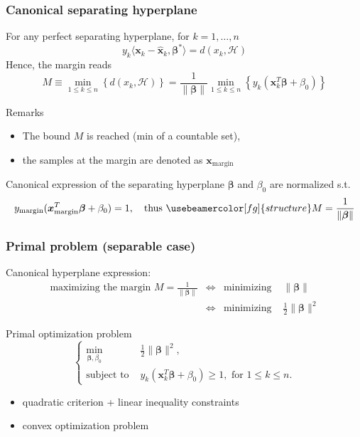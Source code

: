 \documentclass[compress, smaller, serif, 9pt]{beamer}
\newcommand{\structuretext}[1]{{\usebeamercolor[fg]{structure} #1}}
\newcommand{\doigt}{\structuretext{\noindent \Pisymbol{pzd}{43}}}
\newcommand{\bx}{{\boldsymbol{x}}}
\newcommand{\bbeta}{{\boldsymbol{\beta}}}
\begin{document}
  
    \begin{frame}
   \frametitle{Canonical separating hyperplane}

   For any perfect separating hyperplane, for  $k=1,\ldots,n$
   $$y_k \langle \bx_k - \widehat{\bx}_k, \bbeta^{*} \rangle= d(x_k,\mathcal{H})$$ 
   Hence, the 
   margin reads
   $$
   M \equiv \min_{1\le k\le n} \left\{  d(x_k,\mathcal{H}) \right\} =  \frac{1}{\| \bbeta \| } \min_{1\le k\le n} \left\{ y_k ( \bx_k^T \bbeta +\beta_0)  \right\}
   $$
   
   \begin{block}{Remarks}
    \begin{itemize}
     \item The bound $M$ is reached (min of a countable set),
     \item[\doigt] the samples at the margin are denoted as $\bx_{\textrm{margin}}$
    \end{itemize}
\end{block}
\begin{block}{Canonical expression of the separating hyperplane}
 $\bbeta$ and $\beta_0$ are normalized s.t.
     $$
     y_{\textrm{margin}} ( \bx_{\textrm{margin}}^T \bbeta +\beta_0) =1, \quad
   \textrm{thus } 
     \structuretext{M=\frac{1}{\| \bbeta \|}}
     $$
   \end{block}
\end{frame}  


  
\begin{frame}
   \frametitle{Primal problem (separable case)}
   
   Canonical hyperplane expression: 
   $$\begin{array}{lcrc}
   \textrm{maximizing the margin } M=\frac{1}{\| \bbeta \|} & \Leftrightarrow & \textrm{minimizing } & \|\bbeta\|\\
   &  \Leftrightarrow & \textrm{minimizing } & \frac{1}{2}\|\bbeta\|^2
   \end{array}$$
   
   \begin{block}{Primal optimization problem}
   $$\left\{ \begin{array}{lc}
    \min_{\bbeta,\beta_0}    & \frac{1}{2} \|\bbeta\|^2,\\
    \textrm{subject to } &y_k \left( \bx_k^T \bbeta + \beta_0 \right) \ge 1, \textrm{ for } 1 \le k \le n. 
   \end{array}\right. $$
\begin{itemize}
 \item quadratic criterion + linear inequality  constraints
 \item[\doigt]  convex optimization problem %
\end{itemize}

   \end{block}


\end{frame}  
\end{document}
